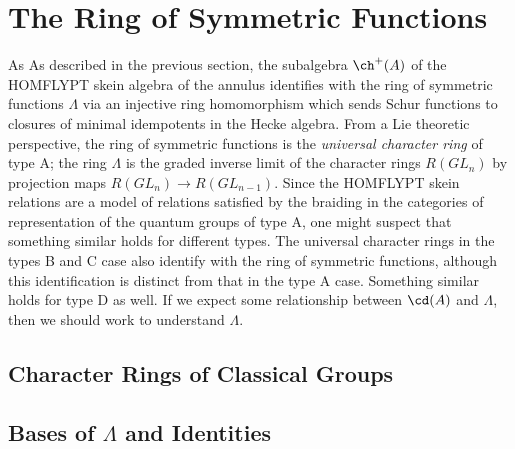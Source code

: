 \section{The Ring of Symmetric Functions}

As As described in the previous section, the subalgebra $\ch^+(A)$ of the HOMFLYPT skein algebra of the annulus identifies with the ring of symmetric functions $\Lambda$ via an injective ring homomorphism which sends Schur functions to closures of minimal idempotents in the Hecke algebra. From a Lie theoretic perspective, the ring of symmetric functions is the \textit{universal character ring} of type A; the ring $\Lambda$ is the graded inverse limit of the character rings $R(GL_n)$ by projection maps $R(GL_n) \to R(GL_{n-1})$. Since the HOMFLYPT skein relations are a model of relations satisfied by the braiding in the categories of representation of the quantum groups of type A, one might suspect that something similar holds for different types. The universal character rings in the types B and C case also identify with the ring of symmetric functions, although this identification is distinct from that in the type A case. Something similar holds for type D as well. If we expect some relationship between $\cd(A)$ and $\Lambda$, then we should work to understand $\Lambda$.

\subsection{Character Rings of Classical Groups}



\subsection{Bases of $\Lambda$ and Identities}





